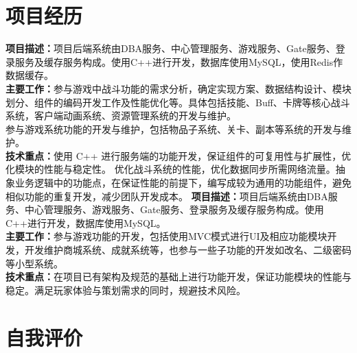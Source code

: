 \documentclass[10pt,a4paper,sans,english]{moderncv}        %
\begin{document}
\section{项目经历}
{\textbf{项目描述：}项目后端系统由DBA服务、中心管理服务、游戏服务、Gate服务、登录服务及缓存服务构成。使用C++进行开发，数据库使用MySQL，使用Redis作数据缓存。
\\\textbf{主要工作：}参与游戏中战斗功能的需求分析，确定实现方案、数据结构设计、模块划分、组件的编码开发工作及性能优化等。具体包括技能、Buff、卡牌等核心战斗系统，客户端动画系统、资源管理系统的开发与维护。\\参与游戏系统功能的开发与维护，包括物品子系统、关卡、副本等系统的开发与维护。 
\\\textbf{技术重点：}使用 C++ 进行服务端的功能开发，保证组件的可复用性与扩展性，优化模块的性能与稳定性。
优化战斗系统的性能，优化数据同步所需网络流量。抽象业务逻辑中的功能点，在保证性能的前提下，编写成较为通用的功能组件，避免相似功能的重复开发，减少团队开发成本。}
{\textbf{项目描述：}项目后端系统由DBA服务、中心管理服务、游戏服务、Gate服务、登录服务及缓存服务构成。使用C++进行开发，数据库使用MySQL。
\\\textbf{主要工作：}参与游戏功能的开发，包括使用MVC模式进行UI及相应功能模块开发，开发维护商城系统、成就系统等，也参与一些子功能的开发如改名、二级密码等小型系统。
\\\textbf{技术重点：}在项目已有架构及规范的基础上进行功能开发，保证功能模块的性能与稳定。满足玩家体验与策划需求的同时，规避技术风险。}
\textbf{\\}
\section{自我评价}
\clearpage
\end{document}
